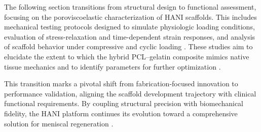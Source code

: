 The following section transitions from structural design to functional assessment, focusing on the poroviscoelastic characterization of HANI scaffolds. This includes mechanical testing protocols designed to simulate physiologic loading conditions, evaluation of stress-relaxation and time-dependent strain responses, and analysis of scaffold behavior under compressive and cyclic loading \cite{disilvestro2001crossvalidationbiphasic, gu2003newinsight, chaudhuri2016hydrogelstunable}. These studies aim to elucidate the extent to which the hybrid PCL–gelatin composite mimics native tissue mechanics and to identify parameters for further optimization \cite{patel2019systematicreview, xiao2013mechanicaltesting, makris2011kneemeniscus}.

This transition marks a pivotal shift from fabrication-focused innovation to performance validation, aligning the scaffold development trajectory with clinical functional requirements. By coupling structural precision with biomechanical fidelity, the HANI platform continues its evolution toward a comprehensive solution for meniscal regeneration \cite{elkommos2025hybridhydrogels, makris2011kneemeniscus, kwon2019surgicaltissue}.
